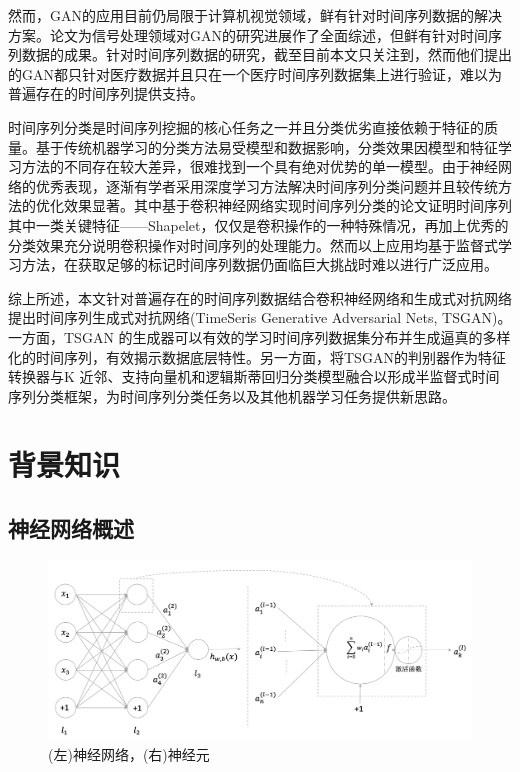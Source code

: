 然而，GAN的应用目前仍局限于计算机视觉领域，鲜有针对时间序列数据的解决方案。论文为信号处理领域对GAN的研究进展作了全面综述，但鲜有针对时间序列数据的成果。针对时间序列数据的研究，截至目前本文只关注到，然而他们提出的GAN都只针对医疗数据并且只在一个医疗时间序列数据集上进行验证，难以为普遍存在的时间序列提供支持。

时间序列分类是时间序列挖掘的核心任务之一并且分类优劣直接依赖于特征的质量。基于传统机器学习的分类方法易受模型和数据影响，分类效果因模型和特征学习方法的不同存在较大差异，很难找到一个具有绝对优势的单一模型\cite{bagnall2017great}。由于神经网络的优秀表现，逐渐有学者采用深度学习方法解决时间序列分类问题并且较传统方法的优化效果显著\cite{cui2016multi,wang2017time}。其中基于卷积神经网络实现时间序列分类的论文证明时间序列其中一类关键特征——Shapelet，仅仅是卷积操作的一种特殊情况，再加上优秀的分类效果充分说明卷积操作对时间序列的处理能力。然而以上应用均基于监督式学习方法，在获取足够的标记时间序列数据仍面临巨大挑战时难以进行广泛应用。

综上所述，本文针对普遍存在的时间序列数据结合卷积神经网络和生成式对抗网络提出时间序列生成式对抗网络(TimeSeris Generative Adversarial Nets, TSGAN)。一方面，TSGAN 的生成器可以有效的学习时间序列数据集分布并生成逼真的多样化的时间序列，有效揭示数据底层特性。另一方面，将TSGAN的判别器作为特征转换器与K 近邻、支持向量机和逻辑斯蒂回归分类模型融合以形成半监督式时间序列分类框架，为时间序列分类任务以及其他机器学习任务提供新思路。
\section{背景知识}


\subsection{神经网络概述}

\begin{figure}[H]
\centering
\includegraphics[scale=0.5]{figures/gan-neural-net.png}
\caption{(左)神经网络，(右)神经元}
\label{fig:gan-nn}
\end{figure}

